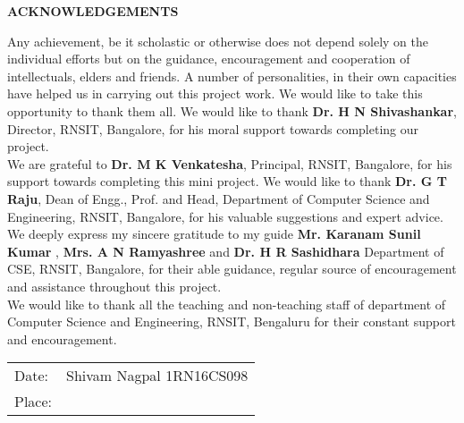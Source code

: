 \thispagestyle{empty}
\begin{center}
\textup{\large{\textbf{ACKNOWLEDGEMENTS}}} \\[0.1in]
\end{center}
\justify
\indent
Any achievement, be it scholastic or otherwise does not depend solely on the individual efforts but on the guidance, encouragement and cooperation of intellectuals, elders and friends. A number of personalities, in their own capacities have helped us in carrying out this project work. We would like to take this opportunity to thank them all.
We would like to thank \textbf{Dr. H N Shivashankar}, Director, RNSIT, Bangalore, for his moral support towards completing our project.\\
We are grateful to \textbf{Dr. M K Venkatesha}, Principal, RNSIT, Bangalore, for his support towards completing this mini project.
We would like to thank \textbf{Dr. G T Raju}, Dean of Engg., Prof. and Head, Department of Computer Science and Engineering, RNSIT, Bangalore, for his valuable suggestions and expert advice.
We deeply express my sincere gratitude to my guide \textbf{Mr. Karanam Sunil Kumar} , \textbf{Mrs. A N Ramyashree} and \textbf{Dr. H R Sashidhara} Department of CSE, RNSIT, Bangalore, for their able guidance, regular source of encouragement and assistance throughout this project.\\
We would like to thank all the teaching and non-teaching staff of department of Computer Science and Engineering, RNSIT, Bengaluru for their constant support and encouragement.\\[2in]
\justify
\begin{tabular}{l r}
\textup{Date:} & \hspace{9cm}\textup{Shivam Nagpal 1RN16CS098}\\
\textup{Place:}
\end{tabular}


\pagebreak
